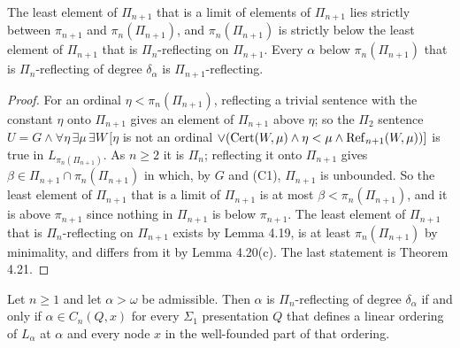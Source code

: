 \documentclass[11pt]{article}
\begin{document}
\begin{statement} The least element of $\Pi_{n+1}$ that is a limit of elements of $\Pi_{n+1}$ lies strictly
between $\pi_{n+1}$ and $\pi_n(\Pi_{n+1})$, and $\pi_n(\Pi_{n+1})$ is strictly below the least element of $\Pi_{n+1}$ that is
$\Pi_n$-reflecting on $\Pi_{n+1}$. Every $\alpha$ below $\pi_n(\Pi_{n+1})$ that is $\Pi_n$-reflecting of degree $\delta_\alpha$ is
$\Pi_{n+1}$-reflecting.
\end{statement}

\begin{proof}
For an ordinal $\eta < \pi_n(\Pi_{n+1})$, reflecting a trivial sentence with the constant $\eta$ onto $\Pi_{n+1}$ gives an element
of $\Pi_{n+1}$ above $\eta$; so the $\Pi_2$ sentence $U = G \wedge \forall \eta\, \exists \mu\, \exists W\, [\eta$ is not an
ordinal $\vee (\mathrm{Cert}(W,\mu) \wedge \eta < \mu \wedge \mathrm{Ref}_{n+1}(W,\mu))]$ is true in $L_{\pi_n(\Pi_{n+1})}$. As $n
\ge 2$ it is $\Pi_n$; reflecting it onto $\Pi_{n+1}$ gives $\beta \in \Pi_{n+1} \cap \pi_n(\Pi_{n+1})$ in which, by $G$ and (C1), $\Pi_{n+1}$
is unbounded. So the least element of $\Pi_{n+1}$ that is a limit of $\Pi_{n+1}$ is at most $\beta < \pi_n(\Pi_{n+1})$, and it is above
$\pi_{n+1}$ since nothing in $\Pi_{n+1}$ is below $\pi_{n+1}$. The least element of $\Pi_{n+1}$ that is $\Pi_n$-reflecting on $\Pi_{n+1}$ exists by
Lemma 4.19, is at least $\pi_n(\Pi_{n+1})$ by minimality, and differs from it by Lemma 4.20(c). The last statement is
Theorem 4.21.
\end{proof}

\begin{statement} Let $n \ge 1$ and let $\alpha > \omega$ be admissible.
Then $\alpha$ is $\Pi_n$-reflecting of degree $\delta_\alpha$ if and only if $\alpha \in C_n(Q,x)$ for every
$\Sigma_1$ presentation $Q$ that defines a linear ordering of $L_\alpha$ at $\alpha$ and every node $x$ in the
well-founded part of that ordering.
\end{statement}
\end{document}

